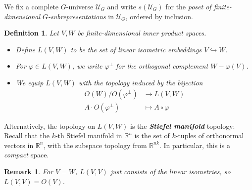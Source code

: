 \documentclass{scrartcl}
\newcommand{\textbi}[1]{\textbf{\textit{#1}}}
\newcommand{\bR}{\mathbb{R}}
\newtheorem{defin}[subsection]{Definition}
\newtheorem{rem}[subsection]{Remark}
\begin{document}
We fix a complete $G$-universe $\mathcal{U}_G$ and write $s(\mathcal{U}_G)$ for the \textit{poset of finite-dimensional $G$-subrepresentations} in $\mathcal{U}_G$, ordered by inclusion. 

\begin{defin}\label{emb}
    Let $V,W$ be finite-dimensional inner product spaces. 
    \begin{itemize}
        \item Define $L(V,W)$ to be the set of linear isometric embeddings $V\hookrightarrow W$. 
        \item For $\varphi\in L(V,W)$, we write $\varphi^\perp$ for the orthogonal complement $W- \varphi(V)$.
        \item We equip $L(V,W)$ with the topology induced by the bijection 
              \begin{align*}
                  O(W)/O(\varphi^\bot) &\to L(V,W) \\
                  A\cdot O(\varphi^\bot) &\mapsto A\circ \varphi
              \end{align*}
    \end{itemize} 
\end{defin} 

Alternatively, the topology on $L(V,W)$ is the \textbi{Stiefel manifold} topology: Recall that the $k$-th Stiefel manifold in $\bR^n$ is the set of $k$-tuples of orthonormal vectors in $\bR^n$, with the subspace topology from $\bR^{nk}$. In particular, this is a \textit{compact} space.  

\begin{rem} \label{isom}
    For $V=W$, $L(V,V)$ just consists of the linear isometries, so $L(V,V)=O(V)$.
\end{rem}
\end{document}
